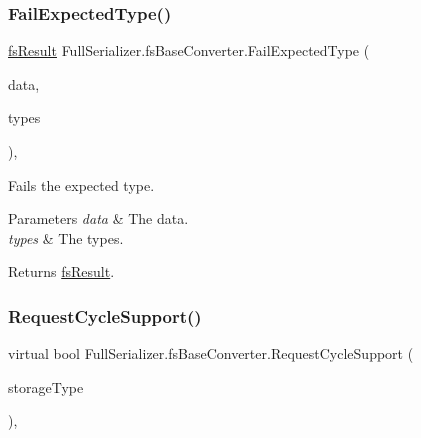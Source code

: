 \subsubsection{\texorpdfstring{Fail\+Expected\+Type()}{FailExpectedType()}}
{\footnotesize\ttfamily \hyperlink{struct_full_serializer_1_1fs_result}{fs\+Result} Full\+Serializer.\+fs\+Base\+Converter.\+Fail\+Expected\+Type (\begin{DoxyParamCaption}\item[{\hyperlink{class_full_serializer_1_1fs_data}{fs\+Data}}]{data,  }\item[{params \hyperlink{namespace_full_serializer_a6eee33d63b94e40fdfcfc59af9fcfc82}{fs\+Data\+Type} \mbox{[}$\,$\mbox{]}}]{types }\end{DoxyParamCaption})\hspace{0.3cm}{\ttfamily [inline]}, {\ttfamily [protected]}}



Fails the expected type. 


\begin{DoxyParams}{Parameters}
{\em data} & The data.\\
\hline
{\em types} & The types.\\
\hline
\end{DoxyParams}
\begin{DoxyReturn}{Returns}
\hyperlink{struct_full_serializer_1_1fs_result}{fs\+Result}.
\end{DoxyReturn}
\mbox{\label{class_full_serializer_1_1fs_base_converter_a4e850ab88cea1b89771c00e0b65febcd}} 
\subsubsection{\texorpdfstring{Request\+Cycle\+Support()}{RequestCycleSupport()}}
{\footnotesize\ttfamily virtual bool Full\+Serializer.\+fs\+Base\+Converter.\+Request\+Cycle\+Support (\begin{DoxyParamCaption}\item[{Type}]{storage\+Type }\end{DoxyParamCaption})\hspace{0.3cm}{\ttfamily [inline]}, {\ttfamily [virtual]}}



